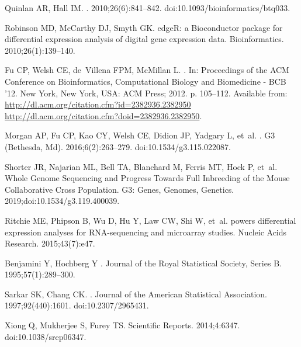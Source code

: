 \documentclass[10pt,letterpaper]{article}
\begin{document}
\begin{thebibliography}{10}
Quinlan AR, Hall IM.
. 2010;26(6):841--842.
\newblock doi:{10.1093/bioinformatics/btq033}.

Robinson MD, McCarthy DJ, Smyth GK.
\newblock edgeR: a Bioconductor package for differential expression analysis of
  digital gene expression data.
\newblock Bioinformatics. 2010;26(1):139--140.

Fu CP, Welsh CE, de~Villena FPM, McMillan L.
.
\newblock In: Proceedings of the ACM Conference on Bioinformatics,
  Computational Biology and Biomedicine - BCB '12. New York, New York, USA: ACM
  Press; 2012. p. 105--112.
\newblock Available from:
  \url{http://dl.acm.org/citation.cfm?id=2382936.2382950
  http://dl.acm.org/citation.cfm?doid=2382936.2382950}.

Morgan AP, Fu CP, Kao CY, Welsh CE, Didion JP, Yadgary L, et~al.
.
\newblock G3 (Bethesda, Md). 2016;6(2):263--279.
\newblock doi:{10.1534/g3.115.022087}.

Shorter JR, Najarian ML, Bell TA, Blanchard M, Ferris MT, Hock P, et~al.
\newblock Whole Genome Sequencing and Progress Towards Full Inbreeding of the
  Mouse Collaborative Cross Population.
\newblock G3: Genes, Genomes, Genetics. 2019;doi:{10.1534/g3.119.400039}.

Ritchie ME, Phipson B, Wu D, Hu Y, Law CW, Shi W, et~al.
 powers differential expression analyses for {RNA}-sequencing
  and microarray studies.
\newblock Nucleic Acids Research. 2015;43(7):e47.

Benjamini Y, Hochberg Y
.
\newblock Journal of the Royal Statistical Society, Series B.
  1995;57(1):289--300.

Sarkar SK, Chang CK.
.
\newblock Journal of the American Statistical Association. 1997;92(440):1601.
\newblock doi:{10.2307/2965431}.

Xiong Q, Mukherjee S, Furey TS.
\newblock Scientific Reports. 2014;4:6347.
\newblock doi:{10.1038/srep06347}.


\end{thebibliography}
\end{document}
